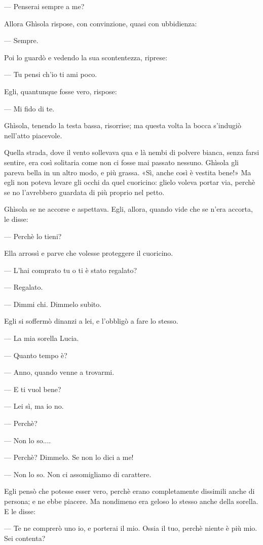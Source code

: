— Penserai sempre a me?

Allora Ghìsola rispose, con convinzione, quasi con ubbidienza:

— Sempre.

Poi lo guardò e vedendo la sua scontentezza, riprese:

— Tu pensi ch’io ti ami poco.

Egli, quantunque fosse vero, rispose:

— Mi fido di te.

Ghìsola, tenendo la testa bassa, risorrise; ma questa volta la bocca s’indugiò nell’atto piacevole.

Quella strada, dove il vento sollevava qua e là nembi di polvere bianca, senza farsi sentire, era così solitaria come non ci fosse mai passato nessuno. Ghìsola gli pareva bella in un altro modo, e più grassa. «Sì, anche così è vestita bene!» Ma egli non poteva levare gli occhi da quel cuoricino: glielo voleva portar via, perchè se no l’avrebbero guardata di più proprio nel petto.

Ghìsola se ne accorse e aspettava. Egli, allora, quando vide che se n’era accorta, le disse:

— Perchè lo tieni?

Ella arrossì e parve che volesse proteggere il cuoricino.

— L’hai comprato tu o ti è stato regalato?

— Regalato.

— Dimmi chi. Dimmelo subito.

Egli si soffermò dinanzi a lei, e l'obbligò a fare lo stesso.

— La mia sorella Lucia.

— Quanto tempo è?

— Anno, quando venne a trovarmi.

— E ti vuol bene?

— Lei sì, ma io no.

— Perchè?

— Non lo so....

— Perchè? Dimmelo. Se non lo dici a me!

— Non lo so. Non ci assomigliamo di carattere.

Egli pensò che potesse esser vero, perchè erano completamente dissimili anche di persona; e ne ebbe piacere. Ma nondimeno era geloso lo stesso anche della sorella. E le disse:

— Te ne comprerò uno io, e porterai il mio. Ossia il tuo, perchè niente è più mio. Sei contenta?

